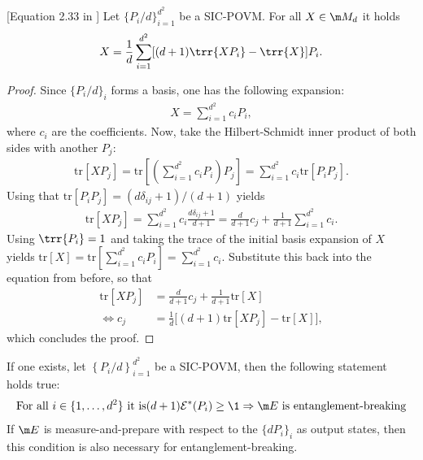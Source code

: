 \begin{lemma}\label{lem:sic}[Equation 2.33 in \cite{wolf2012quantum}] Let $\{P_i/d\}_{i=1}^{d^2}$ be a SIC-POVM. For all $X \in \m M_d$ it holds 
\begin{align*}
    X = \frac{1}{d}\sum_{i=1}^{d^2}[(d+1)\trr{X P_i}-\trr{X}]P_i.
\end{align*}
\end{lemma}
\begin{proof}
Since $\{P_i/d\}_i$ forms a basis, one has the following expansion:
\begin{align*}
    X = \sum_{i=1}^{d^2} c_i P_i,
\end{align*}
where $c_i$ are the coefficients. Now, take the Hilbert-Schmidt inner product of both sides with another $P_j$:
\begin{align*}
    \mathrm{tr}[X P_j] = \mathrm{tr}\left[ \left( \sum_{i=1}^{d^2} c_i P_i \right) P_j \right] = \sum_{i=1}^{d^2} c_i \mathrm{tr}[P_i P_j].
\end{align*}
Using that $
    \mathrm{tr}[P_i P_j] = (d\delta_{ij} + 1)/(d+1)$
yields
\begin{align*} \label{eq:trace_pj}
    \mathrm{tr}[X P_j] = \sum_{i=1}^{d^2} c_i  \frac{d\delta_{ij} + 1}{d+1}  = \frac{d}{d+1}c_j + \frac{1}{d+1}\sum_{i=1}^{d^2} c_i.
\end{align*}
Using $\trr{P_i}=1$ and taking the trace of the initial basis expansion of $X$ yields $
    \mathrm{tr}[X] = \mathrm{tr}\left[ \sum_{i=1}^{d^2} c_i P_i \right] = \sum_{i=1}^{d^2} c_i$.
Substitute this back into the equation from before, so that
\begin{align*}
    \mathrm{tr}[X P_j] &= \frac{d}{d+1}c_j + \frac{1}{d+1}\mathrm{tr}[X] \\\Leftrightarrow 
    c_j &= \frac{1}{d} \big[ (d+1)\mathrm{tr}[X P_j] - \mathrm{tr}[X] \big],
\end{align*}
which concludes the proof.
\end{proof}
\begin{prop}\label{prop:sic}
     If one exists, let $\left\{ P_i/d \right\}_{i=1}^{d^2}$ be a SIC-POVM, then the following statement holds true:
     \begin{align*}
        \text{For all }i \in \{1, \dots, d^2\} \text{ it is}(d+1)\mathcal{E}^*(P_i) \ge \1 \Rightarrow \m E\text{ is entanglement-breaking}
     \end{align*}
 If $\m E$ is measure-and-prepare with respect to the $\{d P_i\}_i$ as output states, then this condition is also necessary for entanglement-breaking.
\end{prop}
